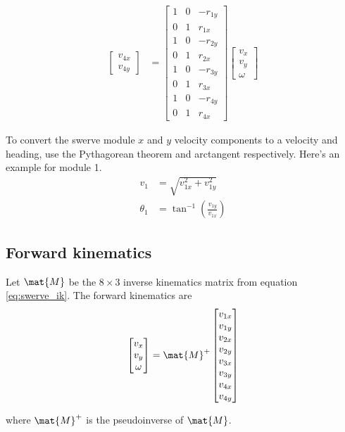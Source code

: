 \begin{align}
\begin{bmatrix}
    v_{4x} \\
    v_{4y}
  \end{bmatrix} &=
  \begin{bmatrix}
    1 & 0 & -r_{1y} \\
    0 & 1 &  r_{1x} \\
    1 & 0 & -r_{2y} \\
    0 & 1 &  r_{2x} \\
    1 & 0 & -r_{3y} \\
    0 & 1 &  r_{3x} \\
    1 & 0 & -r_{4y} \\
    0 & 1 &  r_{4x}
  \end{bmatrix}
  \begin{bmatrix}
    v_x \\
    v_y \\
    \omega
  \end{bmatrix}
\end{align}

To convert the swerve module $x$ and $y$ velocity components to a velocity and
heading, use the Pythagorean theorem and arctangent respectively. Here's an
example for module 1.
\begin{align}
  v_1 &= \sqrt{v_{1x}^2 + v_{1y}^2} \\
  \theta_1 &= \tan^{-1}\left(\frac{v_{1y}}{v_{1x}}\right)
\end{align}

\subsection{Forward kinematics}

Let $\mat{M}$ be the $8 \times 3$ inverse kinematics matrix from equation
\eqref{eq:swerve_ik}. The forward kinematics are
\begin{equation}
  \begin{bmatrix}
    v_x \\
    v_y \\
    \omega
  \end{bmatrix} =
  \mat{M}^+
  \begin{bmatrix}
    v_{1x} \\
    v_{1y} \\
    v_{2x} \\
    v_{2y} \\
    v_{3x} \\
    v_{3y} \\
    v_{4x} \\
    v_{4y}
  \end{bmatrix}
\end{equation}

where $\mat{M}^+$ is the pseudoinverse of $\mat{M}$.
